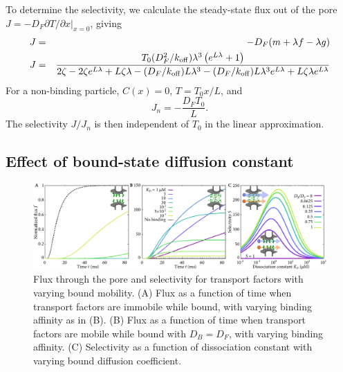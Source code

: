 To determine the selectivity, we calculate the steady-state flux out
of the pore\\ $ J =- D_F \partial T/\partial x|_{x=0}$, giving
\begin{eqnarray}
J& =&-D_F( m + \lambda f - \lambda g) \\
J&=& \frac{{T_0 (D_F^2/k_{\rm off}) { \lambda}^3 \left(e^{L  \lambda}
     + 1\right)}}{2 \zeta - 2 \zeta e^{L  \lambda} + L \zeta
     \lambda - (D_F/k_{\rm off}) L  \lambda^3 - (D_F/k_{\rm off}) L  \lambda^3
     e^{L  \lambda} + L \zeta  \lambda e^{L  \lambda}} 
\end{eqnarray}
For a non-binding particle, $C(x) = 0$, $T = T_0 x / L$, and
\begin{equation}
  J_n =-\frac{D_F T_0}{L}. 
\end{equation}
The selectivity $J/J_n$ is then independent of $T_0$ in
the linear approximation.

\subsection{Effect of bound-state diffusion constant}

\begin{figure}[t!]
\centering
\includegraphics[width=\textwidth]{figs/ch02/fig2.pdf}
\caption[Flux and selectivity as a function of bound mobility.]{Flux through the pore and selectivity for transport factors with varying
  bound mobility. (A) Flux as a function of time when transport factors are immobile
  while bound, with varying binding affinity as in (B).  (B) Flux as a function
  of time when transport factors are mobile while bound with $D_B = D_F$, with
  varying binding affinity.  (C) Selectivity as a function of
  dissociation constant with varying bound diffusion coefficient. }
\label{fig:transient}
\end{figure}

